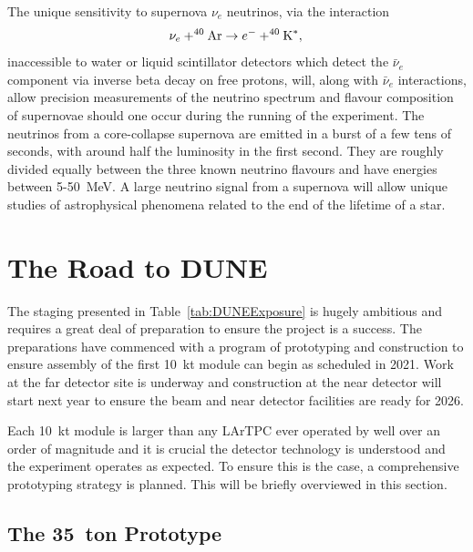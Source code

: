 The unique sensitivity to supernova $\nu_e$ neutrinos, via the interaction
\begin{equation}
  \nu_e + ^{40}\textnormal{Ar} \rightarrow e^- + ^{40}\textnormal{K}^*, \\
\end{equation}
inaccessible to water or liquid scintillator detectors which detect the $\bar{\nu}_e$ component via inverse beta decay on free protons, will, along with $\bar{\nu}_e$ interactions, allow precision measurements of the neutrino spectrum and flavour composition of supernovae should one occur during the running of the experiment.  The neutrinos from a core-collapse supernova are emitted in a burst of a few tens of seconds, with around half the luminosity in the first second.  They are roughly divided equally between the three known neutrino flavours and have energies between 5-50~MeV.  A large neutrino signal from a supernova will allow unique studies of astrophysical phenomena related to the end of the lifetime of a star.

\section{The Road to DUNE}\label{sec:RoadToDUNE}

The staging presented in Table~\ref{tab:DUNEExposure} is hugely ambitious and requires a great deal of preparation to ensure the project is a success.  The preparations have commenced with a program of prototyping and construction to ensure assembly of the first 10~kt module can begin as scheduled in 2021.  Work at the far detector site is underway and construction at the near detector will start next year to ensure the beam and near detector facilities are ready for 2026.

Each 10~kt module is larger than any LArTPC ever operated by well over an order of magnitude and it is crucial the detector technology is understood and the experiment operates as expected.  To ensure this is the case, a comprehensive prototyping strategy is planned.  This will be briefly overviewed in this section.

\subsection{The 35~ton Prototype}\label{sec:35ton}

